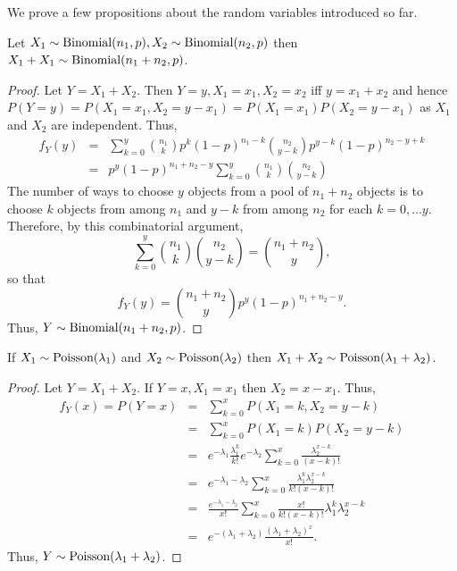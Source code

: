 \documentclass{article}
\begin{document}
We prove a few propositions about the random variables introduced so far.
\begin{prop}\label{c2p3}
Let $X_1 \sim \text{Binomial}(n_1, p), X_2 \sim \text{Binomial}(n_2, p)$ then $X_1 + X_1 \sim
\text{Binomial}(n_1 + n_2, p)$.
\end{prop}
\begin{proof}
Let $Y = X_1 + X_2$. Then $Y = y, X_1 = x_1, X_2 = x_2$ iff $y = x_1 + x_2$ and
hence $P(Y = y) = P(X_1 = x_1, X_2 = y - x_1) = P(X_1 = x_1)P(X_2 = y - x_1)$
as $X_1$ and $X_2$ are independent. Thus,
\begin{eqnarray*}
f_Y(y) &=& \sum_{k=0}^y\binom{n_1}{k}p^{k}(1 - p)^{n_1 - k}\binom{n_2}{y - k}
p^{y - k}(1 - p)^{n_2 - y + k} \\
 &=& p^y(1 - p)^{n_1 + n_2 - y}
 \sum_{k=0}^y\binom{n_1}{k}\binom{n_2}{y - k}
\end{eqnarray*}
The number of ways to choose $y$ objects from a pool of $n_1 + n_2$ objects is
to choose $k$ objects from among $n_1$ and $y - k$ from among $n_2$ for each
$k = 0, \ldots y$. Therefore, by this combinatorial argument,
\[
\sum_{k=0}^y\binom{n_1}{k}\binom{n_2}{y - k} = \binom{n_1+n_2}{y},
\]
so that
\[
f_Y(y) = \binom{n_1+n_2}{y}p^y(1 - p)^{n_1 + n_2 - y}.
\]
Thus, $Y \sim \text{Binomial}(n_1 + n_2, p)$.
\end{proof}

\begin{prop}\label{c2p4}
If $X_1 \sim \text{Poisson}(\lambda_1)$ and $X_2 \sim \text{Poisson}(\lambda_2)$ then $X_1 +
X_2 \sim \text{Poisson}(\lambda_1 + \lambda_2)$.
\end{prop}
\begin{proof}
Let $Y = X_1 + X_2$. If $Y = x, X_1 = x_1$ then $X_2 = x - x_1$. Thus,
\begin{eqnarray*}
f_Y(x) = P(Y = x) &=& \sum_{k=0}^xP(X_1 = k, X_2 = y - k) \\
 &=& \sum_{k=0}^xP(X_1=k)P(X_2=y-k) \\
 &=& e^{-\lambda_1}\frac{\lambda_1^{k}}{k!}e^{-\lambda_2}\sum_{k=0}^x
 \frac{\lambda_2^{x - k}}{(x - k)!} \\
 &=& e^{-\lambda_1 - \lambda_2}\sum_{k=0}^x
 \frac{\lambda_1^{k}\lambda_2^{x-k}}{k!(x-k)!} \\
 &=& \frac{e^{-\lambda_1 - \lambda_2}}{x!}\sum_{k=0}^x
 \frac{x!}{k!(x-k)!}\lambda_1^{k}\lambda_2^{x-k} \\
 &=& e^{-(\lambda_1 + \lambda_2)}\frac{(\lambda_1 + \lambda_2)^x}{x!}.
\end{eqnarray*} 
Thus, $Y \sim \text{Poisson}(\lambda_1 + \lambda_2)$.
\end{proof}
\end{document}

